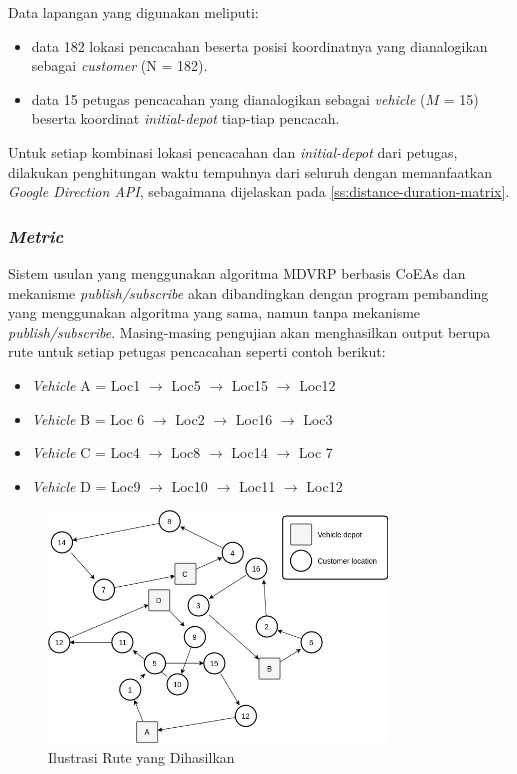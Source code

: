 Data lapangan yang digunakan meliputi:
\begin{itemize}
	\item data 182 lokasi pencacahan beserta posisi koordinatnya yang dianalogikan sebagai \textit{customer} (N = 182). 
	\item data 15 petugas pencacahan yang dianalogikan sebagai \textit{vehicle} ($M$ = 15) beserta koordinat \textit{initial-depot} tiap-tiap pencacah.
\end{itemize}

Untuk setiap kombinasi lokasi pencacahan dan \textit{initial-depot} dari petugas, dilakukan penghitungan waktu tempuhnya  dari seluruh dengan memanfaatkan \textit{Google Direction API}, sebagaimana dijelaskan pada \autoref{ss:distance-duration-matrix}.


\subsubsection{\textit{Metric}}
\label{sssec:metric}
Sistem usulan yang menggunakan algoritma MDVRP berbasis CoEAs dan mekanisme \textit{publish/subscribe} akan dibandingkan dengan program pembanding yang menggunakan algoritma yang sama, namun tanpa mekanisme \textit{publish/subscribe}. Masing-masing pengujian akan menghasilkan output berupa rute untuk setiap petugas pencacahan seperti contoh berikut:

\begin{itemize}
	\item \textit{Vehicle} A = Loc1 $\rightarrow$ Loc5 $\rightarrow$ Loc15 $\rightarrow$ Loc12
	\item \textit{Vehicle} B = Loc 6 $\rightarrow$ Loc2 $\rightarrow$ Loc16 $\rightarrow$ Loc3
	\item \textit{Vehicle} C = Loc4 $\rightarrow$ Loc8 $\rightarrow$ Loc14 $\rightarrow$ Loc 7
	\item \textit{Vehicle} D = Loc9 $\rightarrow$ Loc10 $\rightarrow$ Loc11 $\rightarrow$ Loc12
\end{itemize}


\begin{figure}[!]
	\centering
	\includegraphics[width=9cm]{Resources/Images/result-mdvrp-illustration}
	\caption{Ilustrasi Rute yang Dihasilkan}
	\label{fig:result-mdvrp-illustration}
\end{figure}


